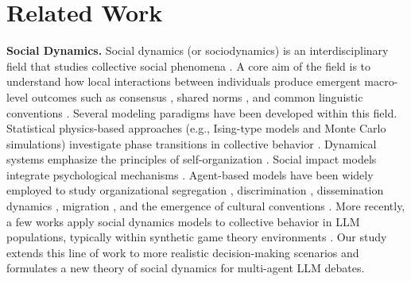 \documentclass{article}
\theoremstyle{plain}
\theoremstyle{definition}
\theoremstyle{remark}
\begin{document}
\section{Related Work}
\textbf{Social Dynamics. }
Social dynamics (or sociodynamics) is an interdisciplinary field that studies collective social phenomena \cite{weidlich2006sociodynamics,WEIDLICH19911}. 
A core aim of the field is to understand how local interactions between individuals produce emergent macro-level outcomes \cite{RevModPhys.81.591} such as consensus \cite{flache2017}, shared norms \cite{centola2015spontaneous}, and common linguistic conventions \cite{abrams2003modelling}. 
Several modeling paradigms have been developed within this field. 
Statistical physics-based approaches (e.g., Ising-type models and Monte Carlo simulations) investigate phase transitions in collective behavior \cite{landau2021guide}. Dynamical systems emphasize the principles of self-organization \cite{haken1977synergetics}. Social impact models integrate psychological mechanisms \cite{holyst2000199}. Agent-based models have been widely employed to study organizational segregation \cite{martell2012bias}, discrimination \cite{yasar2025emergence}, dissemination dynamics \cite{axelrod1997}, migration \cite{Schelling01071971}, and the emergence of cultural conventions \cite{centola2015spontaneous}.
More recently, a few works apply social dynamics models to collective behavior in LLM populations, typically within synthetic game theory environments \cite{ashery2025,takata2025emergent}. 
Our study extends this line of work to more realistic decision-making scenarios and formulates a new theory of social dynamics for multi-agent LLM debates. 
 
\end{document}
